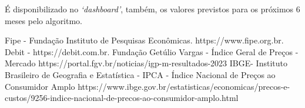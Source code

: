 \documentclass[conference]{IEEEtran}
\begin{document}
É disponibilizado no \textit{`dashboard'}, também, os valores previstos para os próximos 6 meses pelo algoritmo.

\begin{thebibliography}{00}
	 Fipe - Fundação Instituto de Pesquisas Econômicas. https://www.fipe.org.br.
	 Debit - https://debit.com.br.
	 Fundação Getúlio Vargas - Índice Geral de Preços - Mercado https://portal.fgv.br/noticias/igp-m-resultados-2023
	 IBGE- Instituto Brasileiro de Geografia e Estatística - IPCA - Índice Nacional de Preços ao Consumidor Amplo https://www.ibge.gov.br/estatisticas/economicas/precos-e-custos/9256-indice-nacional-de-precos-ao-consumidor-amplo.html
\end{thebibliography}
\end{document}
